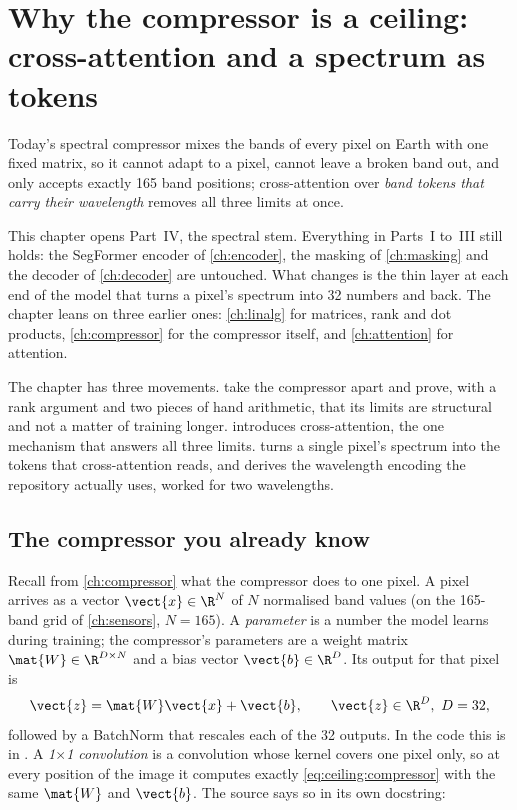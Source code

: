 \chapter{Why the compressor is a ceiling: cross-attention and a spectrum as tokens}\label{ch:ceiling}

\begin{onething}
Today's spectral compressor mixes the bands of every pixel on Earth with one fixed matrix, so it cannot adapt to a pixel, cannot leave a broken band out, and only accepts exactly 165 band positions; cross-attention over \emph{band tokens that carry their wavelength} removes all three limits at once.
\end{onething}

This chapter opens Part~IV, the spectral stem. Everything in Parts~I to~III still holds: the SegFormer encoder of \cref{ch:encoder}, the masking of \cref{ch:masking} and the decoder of \cref{ch:decoder} are untouched. What changes is the thin layer at each end of the model that turns a pixel's spectrum into 32 numbers and back. The chapter leans on three earlier ones: \cref{ch:linalg} for matrices, rank and dot products, \cref{ch:compressor} for the compressor itself, and \cref{ch:attention} for attention.

The chapter has three movements.  take the compressor apart and prove, with a rank argument and two pieces of hand arithmetic, that its limits are structural and not a matter of training longer.  introduces cross-attention, the one mechanism that answers all three limits.  turns a single pixel's spectrum into the tokens that cross-attention reads, and derives the wavelength encoding the repository actually uses, worked for two wavelengths.

\section{The compressor you already know}\label{sec:ceiling:recap}

Recall from \cref{ch:compressor} what the compressor does to one pixel. A pixel arrives as a vector $\vect{x}\in\R^{N}$ of $N$ normalised band values (on the 165-band grid of \cref{ch:sensors}, $N = 165$). A \emph{parameter} is a number the model learns during training; the compressor's parameters are a weight matrix $\mat{W}\in\R^{D\times N}$ and a bias vector $\vect{b}\in\R^{D}$. Its output for that pixel is
\begin{equation}\label{eq:ceiling:compressor}
  \vect{z} = \mat{W}\vect{x} + \vect{b}, \qquad \vect{z}\in\R^{D},\ D = 32,
\end{equation}
followed by a BatchNorm that rescales each of the 32 outputs. In the code this is  in . A \emph{1$\times$1 convolution} is a convolution whose kernel covers one pixel only, so at every position of the image it computes exactly \cref{eq:ceiling:compressor} with the same $\mat{W}$ and $\vect{b}$. The source says so in its own docstring:

